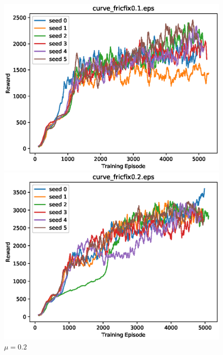 \begin{figure}[p]
 \begin{minipage}{0.49\hsize}
  \begin{center}
 \includegraphics[width=.99\linewidth]{./fig/curve_fricfix0.1.eps}
  \caption{$\mu=0.1$
  }
  \end{center}
 \end{minipage}
 \begin{minipage}{0.49\hsize}
   \begin{center}
 \includegraphics[width=.99\linewidth]{./fig/curve_fricfix0.2.eps}
  \caption{$\mu=0.2$
     }
  \end{center}
 \end{minipage}
\end{figure}

